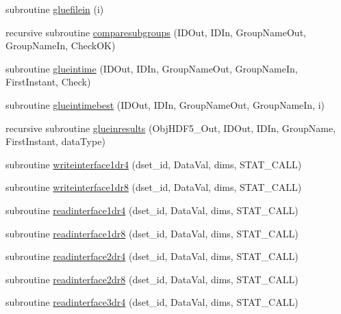 \begin{DoxyCompactItemize}
\item 
subroutine \mbox{\hyperlink{namespacemodulegluehdf5files_a102906b766caaf9abc74b0c0de97ab0c}{gluefilein}} (i)
\item 
recursive subroutine \mbox{\hyperlink{namespacemodulegluehdf5files_aeacbdb79a83691a90c236da51ac23775}{comparesubgroups}} (I\+D\+Out, I\+D\+In, Group\+Name\+Out, Group\+Name\+In, Check\+OK)
\item 
subroutine \mbox{\hyperlink{namespacemodulegluehdf5files_af9077091d4ab6580969f5d961ccc9b22}{glueintime}} (I\+D\+Out, I\+D\+In, Group\+Name\+Out, Group\+Name\+In, First\+Instant, Check)
\item 
subroutine \mbox{\hyperlink{namespacemodulegluehdf5files_a58aecafa3c64f2f6546b818404f30b15}{glueintimebest}} (I\+D\+Out, I\+D\+In, Group\+Name\+Out, Group\+Name\+In, i)
\item 
recursive subroutine \mbox{\hyperlink{namespacemodulegluehdf5files_a3433c6674efedbc9d8386001b56ecbfd}{glueinresults}} (Obj\+H\+D\+F5\+\_\+\+Out, I\+D\+Out, I\+D\+In, Group\+Name, First\+Instant, data\+Type)
\item 
subroutine \mbox{\hyperlink{namespacemodulegluehdf5files_a6eedc150fe0ffbc5acbf71f7281bad4e}{writeinterface1dr4}} (dset\+\_\+id, Data\+Val, dims, S\+T\+A\+T\+\_\+\+C\+A\+LL)
\item 
subroutine \mbox{\hyperlink{namespacemodulegluehdf5files_a4828bbbb17a4c4d536a11e4a4c1c719b}{writeinterface1dr8}} (dset\+\_\+id, Data\+Val, dims, S\+T\+A\+T\+\_\+\+C\+A\+LL)
\item 
subroutine \mbox{\hyperlink{namespacemodulegluehdf5files_aa4ca3b87506cf4d1f6d0a509d189116b}{readinterface1dr4}} (dset\+\_\+id, Data\+Val, dims, S\+T\+A\+T\+\_\+\+C\+A\+LL)
\item 
subroutine \mbox{\hyperlink{namespacemodulegluehdf5files_a1b5be0395974808f570b4d4721230b84}{readinterface1dr8}} (dset\+\_\+id, Data\+Val, dims, S\+T\+A\+T\+\_\+\+C\+A\+LL)
\item 
subroutine \mbox{\hyperlink{namespacemodulegluehdf5files_aac62a4c40cdd50f31e9b2a371111b634}{readinterface2dr4}} (dset\+\_\+id, Data\+Val, dims, S\+T\+A\+T\+\_\+\+C\+A\+LL)
\item 
subroutine \mbox{\hyperlink{namespacemodulegluehdf5files_a4c82afb4d739b4b7b9ef8b8143ce5cb0}{readinterface2dr8}} (dset\+\_\+id, Data\+Val, dims, S\+T\+A\+T\+\_\+\+C\+A\+LL)
\item 
subroutine \mbox{\hyperlink{namespacemodulegluehdf5files_a645aa70b5f322da2680c2517ec2c3cd2}{readinterface3dr4}} (dset\+\_\+id, Data\+Val, dims, S\+T\+A\+T\+\_\+\+C\+A\+LL)

\end{DoxyCompactItemize}
